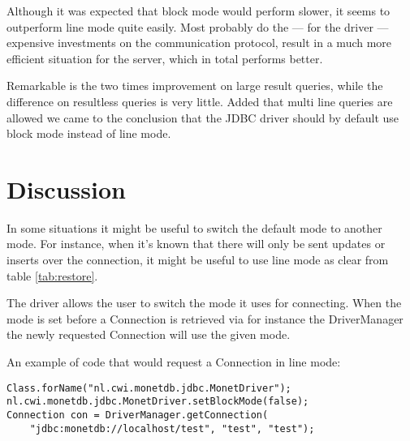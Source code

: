 \documentclass{article}
\begin{document}
Although it was expected that block mode would perform slower, it
seems to outperform line mode quite easily. Most probably do the ---
for the driver --- expensive investments on the communication
protocol, result in a much more efficient situation for the server, which
in total performs better.

Remarkable is the two times improvement on large result queries, while
the difference on resultless queries is very little. Added that multi line
queries are allowed we came to the conclusion that the JDBC driver
should by default use block mode instead of line mode.


\section{Discussion}

In some situations it might be useful to switch the default mode to
another mode. For instance, when it's known that there will only be
sent updates or inserts over the connection, it might be useful to
use line mode as clear from table \ref{tab:restore}.

The driver allows the user to switch the mode it uses for connecting.
When the mode is set before a \textsf{Connection} is retrieved via
for instance the \textsf{DriverManager} the newly requested
\textsf{Connection} will use the given mode.

An example of code that would request a \textsf{Connection} in line
mode:
\begin{verbatim}
Class.forName("nl.cwi.monetdb.jdbc.MonetDriver");
nl.cwi.monetdb.jdbc.MonetDriver.setBlockMode(false);
Connection con = DriverManager.getConnection(
 	"jdbc:monetdb://localhost/test", "test", "test");
\end{verbatim}
\end{document}
